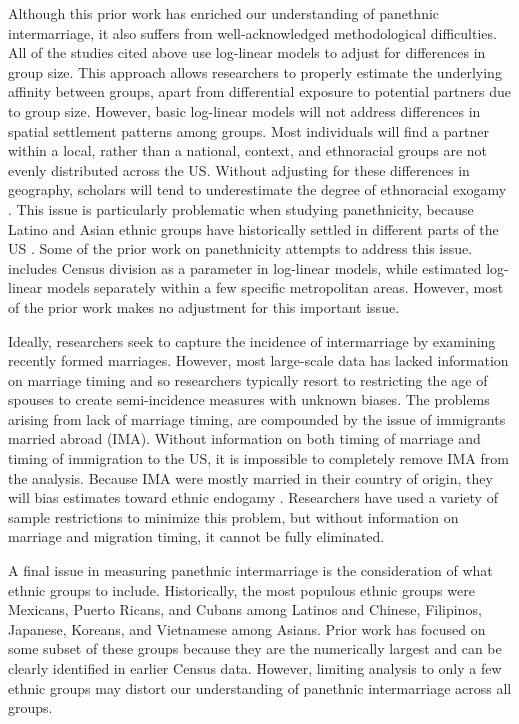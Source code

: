 \documentclass[11pt,]{article}
\begin{document}
Although this prior work has enriched our understanding of panethnic intermarriage, it also suffers from well-acknowledged methodological difficulties. All of the studies cited above use log-linear models to adjust for differences in group size. This approach allows researchers to properly estimate the underlying affinity between groups, apart from differential exposure to potential partners due to group size. However, basic log-linear models will not address differences in spatial settlement patterns among groups. Most individuals will find a partner within a local, rather than a national, context, and ethnoracial groups are not evenly distributed across the US. Without adjusting for these differences in geography, scholars will tend to underestimate the degree of ethnoracial exogamy \citep{harris_how_2005}. This issue is particularly problematic when studying panethnicity, because Latino and Asian ethnic groups have historically settled in different parts of the US \citep{massey_geographic_2008}. Some of the prior work on panethnicity attempts to address this issue. \citet{fu_how_2007a} includes Census division as a parameter in log-linear models, while \citet{rosenfeld_salience_2001} estimated log-linear models separately within a few specific metropolitan areas. However, most of the prior work makes no adjustment for this important issue.

Ideally, researchers seek to capture the incidence of intermarriage by examining recently formed marriages. However, most large-scale data has lacked information on marriage timing and so researchers typically resort to restricting the age of spouses to create semi-incidence measures with unknown biases. The problems arising from lack of marriage timing, are compounded by the issue of immigrants married abroad (IMA). Without information on both timing of marriage and timing of immigration to the US, it is impossible to completely remove IMA from the analysis. Because IMA were mostly married in their country of origin, they will bias estimates toward ethnic endogamy \citep{hwang_problem_1990}. Researchers have used a variety of sample restrictions to minimize this problem, but without information on marriage and migration timing, it cannot be fully eliminated.

A final issue in measuring panethnic intermarriage is the consideration of what ethnic groups to include. Historically, the most populous ethnic groups were Mexicans, Puerto Ricans, and Cubans among Latinos and Chinese, Filipinos, Japanese, Koreans, and Vietnamese among Asians. Prior work has focused on some subset of these groups because they are the numerically largest and can be clearly identified in earlier Census data. However, limiting analysis to only a few ethnic groups may distort our understanding of panethnic intermarriage across all groups.
\end{document}

